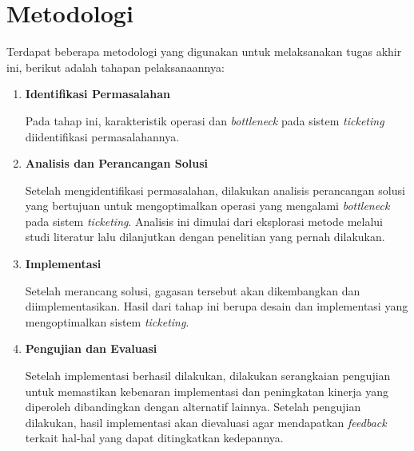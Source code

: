 \section{Metodologi}

Terdapat beberapa metodologi yang digunakan untuk melaksanakan tugas akhir ini, berikut adalah tahapan pelaksanaannya:
\begin{enumerate}
      \item \textbf{Identifikasi Permasalahan}

            Pada tahap ini, karakteristik operasi dan \textit{bottleneck} pada sistem \textit{ticketing} diidentifikasi permasalahannya.

      \item \textbf{Analisis dan Perancangan Solusi}

            Setelah mengidentifikasi permasalahan, dilakukan analisis perancangan solusi yang bertujuan untuk mengoptimalkan operasi yang mengalami \textit{bottleneck} pada sistem \textit{ticketing}. Analisis ini dimulai dari eksplorasi metode melalui studi literatur lalu dilanjutkan dengan penelitian yang pernah dilakukan.

      \item \textbf{Implementasi}

            Setelah merancang solusi, gagasan tersebut akan dikembangkan dan diimplementasikan. Hasil dari tahap ini berupa desain dan implementasi yang mengoptimalkan sistem \textit{ticketing}.

      \item \textbf{Pengujian dan Evaluasi}

            Setelah implementasi berhasil dilakukan, dilakukan serangkaian pengujian untuk memastikan kebenaran implementasi dan peningkatan kinerja yang diperoleh dibandingkan dengan alternatif lainnya. Setelah pengujian dilakukan, hasil implementasi akan dievaluasi agar mendapatkan \textit{feedback} terkait hal-hal yang dapat ditingkatkan kedepannya.

\end{enumerate}
